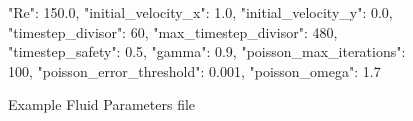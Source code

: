 \begin{figure}[ht]
    \centering
    \begin{jsoncode}
{
    "Re": 150.0,
    "initial_velocity_x": 1.0,
    "initial_velocity_y": 0.0,
    "timestep_divisor": 60,
    "max_timestep_divisor": 480,
    "timestep_safety": 0.5,
    "gamma": 0.9,
    "poisson_max_iterations": 100,
    "poisson_error_threshold": 0.001,
    "poisson_omega": 1.7
}
\end{jsoncode}
    \caption{Example Fluid Parameters file}
    \label{fig:FluidParamsExample}
\end{figure}